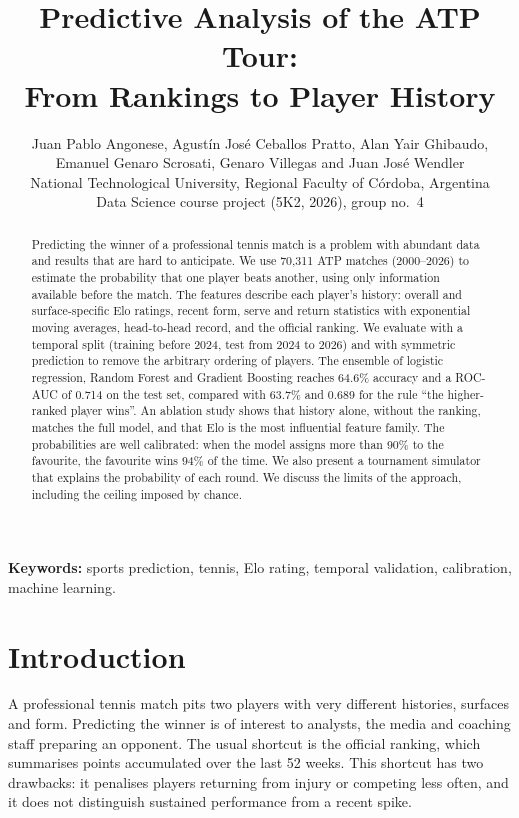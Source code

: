 \documentclass[11pt,a4paper]{article}
\title{\textbf{Predictive Analysis of the ATP Tour:\\From Rankings to Player History}}
\author{
  Juan Pablo Angonese, Agustín José Ceballos Pratto, Alan Yair Ghibaudo,\\
  Emanuel Genaro Scrosati, Genaro Villegas and Juan José Wendler\\[4pt]
  \small National Technological University, Regional Faculty of Córdoba, Argentina\\
  \small Data Science course project (5K2, 2026), group no.~4
}
\date{}
\begin{document}
\maketitle

\begin{abstract}
Predicting the winner of a professional tennis match is a problem with abundant data and results that are hard to anticipate. We use 70,311 ATP matches (2000--2026) to estimate the probability that one player beats another, using only information available before the match. The features describe each player's history: overall and surface-specific Elo ratings, recent form, serve and return statistics with exponential moving averages, head-to-head record, and the official ranking. We evaluate with a temporal split (training before 2024, test from 2024 to 2026) and with symmetric prediction to remove the arbitrary ordering of players. The ensemble of logistic regression, Random Forest and Gradient Boosting reaches 64.6\% accuracy and a ROC-AUC of 0.714 on the test set, compared with 63.7\% and 0.689 for the rule ``the higher-ranked player wins''. An ablation study shows that history alone, without the ranking, matches the full model, and that Elo is the most influential feature family. The probabilities are well calibrated: when the model assigns more than 90\% to the favourite, the favourite wins 94\% of the time. We also present a tournament simulator that explains the probability of each round. We discuss the limits of the approach, including the ceiling imposed by chance.
\end{abstract}

\noindent\textbf{Keywords:} sports prediction, tennis, Elo rating, temporal validation, calibration, machine learning.

\section{Introduction}

A professional tennis match pits two players with very different histories, surfaces and form. Predicting the winner is of interest to analysts, the media and coaching staff preparing an opponent. The usual shortcut is the official ranking, which summarises points accumulated over the last 52 weeks. This shortcut has two drawbacks: it penalises players returning from injury or competing less often, and it does not distinguish sustained performance from a recent spike.
\end{document}
